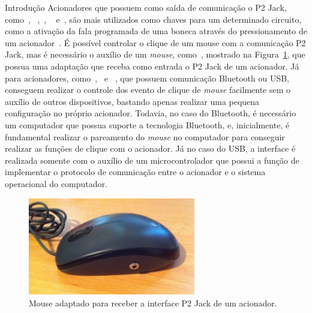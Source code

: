 \begin{chapter}{Introdução}
Acionadores que possuem como saída de comunicação o P2 Jack,
como~\cite{CandyCorn}, ~\cite{JellyBean},~\cite{MicroLight}, ~\cite{HoneyBee}
e~\cite{StringSwitch}, são mais utilizados como chaves para um determinado
circuito, como a ativação da fala programada de uma boneca através do
pressionamento de um acionador~\cite{ATswitchYT}. %
É possível controlar o clique de um mouse com a comunicação P2
Jack, mas é necessário o auxílio de um \textit{mouse}, como~\cite{MouseJack},
mostrado na Figura~\ref{fig:mouse}, que possua uma adaptação que receba como
entrada o P2 Jack de um acionador.  Já para acionadores,
como~\cite{Blue2},~\cite{FootPedal} e ~\cite{SipPuff}, que possuem comunicação
Bluetooth ou USB, conseguem realizar o controle dos evento de clique de
\textit{mouse} facilmente sem o auxílio de outros dispositivos, bastando apenas
realizar uma pequena configuração no próprio acionador. Todavia, no caso do
Bluetooth, é necessário um computador que possua suporte a tecnologia Bluetooth,
e, inicialmente, é fundamental realizar o pareamento do \textit{mouse} no
computador para conseguir realizar as funções de clique com o acionador. Já no
caso do USB, a interface é realizada somente com o auxílio de um
microcontrolador que possui a função de implementar o protocolo de comunicação
entre o acionador e o sistema operacional do computador.

\begin{figure}[!h]
	\centering
	\includegraphics[width=0.65\textwidth]{fig/mouse13}
	\caption{Mouse adaptado para receber a interface P2 Jack de um acionador.}
	\label{fig:mouse}
\end{figure}


\end{chapter}
